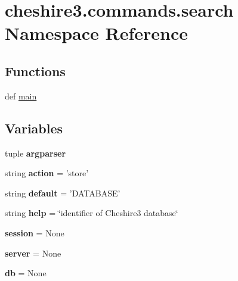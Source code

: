 \hypertarget{namespacecheshire3_1_1commands_1_1search}{\section{cheshire3.\-commands.\-search Namespace Reference}
\label{namespacecheshire3_1_1commands_1_1search}
}
\subsection*{Functions}
\begin{DoxyCompactItemize}
\item 
def \hyperlink{namespacecheshire3_1_1commands_1_1search_a53bc641b6d507f3ba03b7acf338132a9}{main}
\end{DoxyCompactItemize}
\subsection*{Variables}
\begin{DoxyCompactItemize}
\item 
tuple {\bfseries argparser}
\item 
\hypertarget{namespacecheshire3_1_1commands_1_1search_ab4fb72394b4383bcca8afafa8b4cb19c}{string {\bfseries action} = 'store'}\label{namespacecheshire3_1_1commands_1_1search_ab4fb72394b4383bcca8afafa8b4cb19c}

\item 
\hypertarget{namespacecheshire3_1_1commands_1_1search_ac9cedcde0759ce2b8338fd63569839a6}{string {\bfseries default} = 'D\-A\-T\-A\-B\-A\-S\-E'}\label{namespacecheshire3_1_1commands_1_1search_ac9cedcde0759ce2b8338fd63569839a6}

\item 
\hypertarget{namespacecheshire3_1_1commands_1_1search_afbcc61662f54dac9db1c7079b600713d}{string {\bfseries help} = \char`\"{}identifier of Cheshire3 database\char`\"{}}\label{namespacecheshire3_1_1commands_1_1search_afbcc61662f54dac9db1c7079b600713d}

\item 
\hypertarget{namespacecheshire3_1_1commands_1_1search_a082dda610e7880a51d83424681f608c7}{{\bfseries session} = None}\label{namespacecheshire3_1_1commands_1_1search_a082dda610e7880a51d83424681f608c7}

\item 
\hypertarget{namespacecheshire3_1_1commands_1_1search_aeaf45025880a38be8d540880472aa2c0}{{\bfseries server} = None}\label{namespacecheshire3_1_1commands_1_1search_aeaf45025880a38be8d540880472aa2c0}

\item 
\hypertarget{namespacecheshire3_1_1commands_1_1search_ae2b4e3dc02a199827ae8ac37498d2460}{{\bfseries db} = None}\label{namespacecheshire3_1_1commands_1_1search_ae2b4e3dc02a199827ae8ac37498d2460}

\end{DoxyCompactItemize}


